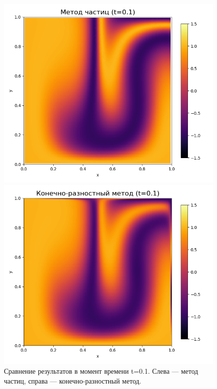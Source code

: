 \documentclass[a4paper,12pt]{article}
\begin{document}
\begin{figure}[H]
    \centering
    \begin{minipage}{0.49\textwidth}
        \centering
        \includegraphics[width=\linewidth]{comparison_results/particle_method_t_0.1.png}
    \end{minipage}
    \hfill
    \begin{minipage}{0.49\textwidth}
        \centering
        \includegraphics[width=\linewidth]{comparison_results/fdm_method_t_0.1.png}
    \end{minipage}
    \caption{Сравнение результатов в момент времени t=0.1. Слева — метод частиц, справа — конечно-разностный метод.}
    \label{fig:t01}
\end{figure}
\end{document}
